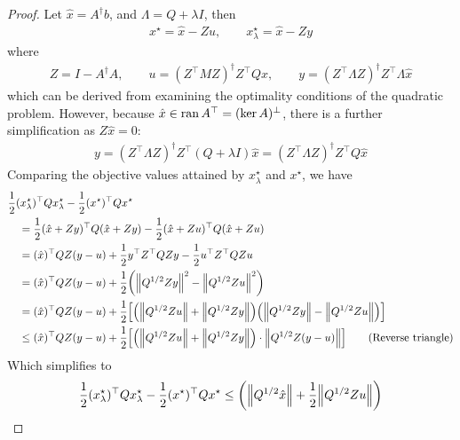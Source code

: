 \documentclass[12pt]{article}
\begin{document}
\begin{proof}
  Let \(\hat{x} = A^\dagger b\), and \(\Lambda = Q + \lambda I\), then
  \begin{align*}
    x^\star = \hat{x} - Z u,
      \qquad x_\lambda ^\star = \hat{x} - Z y
  \end{align*}
  where
  \begin{align*}
    Z = I - A^\dagger A,
      \qquad
      u = (Z^\top M Z)^{\dagger} Z^\top Q \hat{x},
      \qquad
      y = (Z^\top \Lambda Z)^{\dagger} Z^\top \Lambda \hat{x}
  \end{align*}
  which can be derived from examining the optimality conditions of the
  quadratic problem.
  However, because \(\hat{x} \in \operatorname{ran} A^\top = (\operatorname{ker} A)^\perp\),
  there is a further simplification as
  \(Z \hat{x} = 0\):
  \begin{align*}
    y = (Z^\top \Lambda Z)^{\dagger} Z^\top (Q + \lambda I) \hat{x}
      = (Z^\top \Lambda Z)^{\dagger} Z^\top Q \hat{x}
  \end{align*}
  Comparing the objective values attained by \(x_\lambda ^\star\)
  and \(x^\star\), we have
  \begin{align*}
    &\frac{1}{2} (x_\lambda ^\star)^\top Q x_\lambda ^\star
      - \frac{1}{2} (x^\star)^\top Q x^\star \\
    &\quad= \frac{1}{2} (\hat{x} + Z y)^\top Q (\hat{x} + Z y)
          - \frac{1}{2} (\hat{x} + Z u)^\top Q (\hat{x} + Z u) \\
    &\quad=
      (\hat{x})^\top Q Z (y - u)
       + \frac{1}{2} y^\top Z^\top Q Z y
       - \frac{1}{2} u^\top Z^\top Q Z u \\
    &\quad=
      (\hat{x})^\top Q Z (y - u)
        + \frac{1}{2}{\left({\left\lVert Q^{1/2} Z y\right\rVert}^2 - {\left\lVert Q^{1/2} Z u\right\rVert}^2\right)} \\
    &\quad=
      (\hat{x})^\top Q Z (y - u)
        + \frac{1}{2}
          {\left[{\left({\left\lVert Q^{1/2} Z u\right\rVert} + {\left\lVert Q^{1/2} Z y\right\rVert}\right)}
                {\left({\left\lVert Q^{1/2} Z y\right\rVert} - {\left\lVert Q^{1/2} Z u\right\rVert}\right)}\right]} \\
    &\quad\leq
      (\hat{x})^\top Q Z (y - u)
        + \frac{1}{2}
          {\left[{\left({\left\lVert Q^{1/2} Z u\right\rVert} + {\left\lVert Q^{1/2} Z y\right\rVert}\right)}
            \cdot {\left\lVert Q^{1/2} Z (y - u)\right\rVert}\right]}
            \tag{Reverse triangle}
  \end{align*}
  Which simplifies to
  \begin{align}
    \frac{1}{2} (x_\lambda ^\star)^\top Q x_\lambda ^\star
      - \frac{1}{2} (x^\star)^\top Q x^\star
    \leq
      {\left({\left\lVert Q^{1/2} \hat{x}\right\rVert}
        + \frac{1}{2} {\left\lVert Q^{1/2} Z u\right\rVert}
\right)}
\end{align}
\end{proof}
\end{document}
